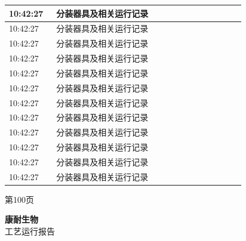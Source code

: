 \documentclass[UTF8,10pt,a4paper,fontset=fandol]{ctexart}
\begin{document}
\begin{center}
\begin{minipage}[t]{0.46\linewidth}
\begin{tabular}{|p{0.18\linewidth}|p{0.72\linewidth}|}
10:42:27 & 分装器具及相关运行记录 \\ \hline
10:42:27 & 分装器具及相关运行记录 \\ \hline
10:42:27 & 分装器具及相关运行记录 \\ \hline
10:42:27 & 分装器具及相关运行记录 \\ \hline
10:42:27 & 分装器具及相关运行记录 \\ \hline
10:42:27 & 分装器具及相关运行记录 \\ \hline
10:42:27 & 分装器具及相关运行记录 \\ \hline
10:42:27 & 分装器具及相关运行记录 \\ \hline
10:42:27 & 分装器具及相关运行记录 \\ \hline
10:42:27 & 分装器具及相关运行记录 \\ \hline
10:42:27 & 分装器具及相关运行记录 \\ \hline
10:42:27 & 分装器具及相关运行记录 \\ \hline
\end{tabular}

\vspace{3pt}
第100页
\end{minipage}

\vspace{18pt}

\begin{minipage}[t]{0.46\linewidth}
\centering
\textbf{康耐生物}\\[2pt]
工艺运行报告


\end{minipage}
\end{center}
\end{document}
